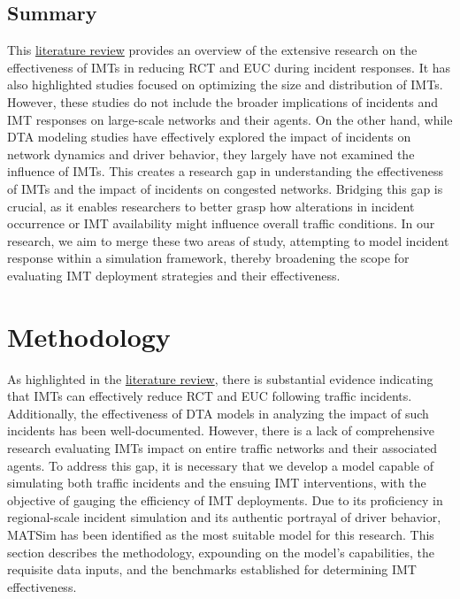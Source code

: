 \documentclass[fancy, oneside, mastersfancy, ms]{byuthesis}
\begin{document}
\hypertarget{sec-lit_summary}{%
\section{Summary}\label{sec-lit_summary}}

This \protect\hyperlink{sec-literature}{literature review} provides an
overview of the extensive research on the effectiveness of IMTs in
reducing RCT and EUC during incident responses. It has also highlighted
studies focused on optimizing the size and distribution of IMTs.
However, these studies do not include the broader implications of
incidents and IMT responses on large-scale networks and their agents. On
the other hand, while DTA modeling studies have effectively explored the
impact of incidents on network dynamics and driver behavior, they
largely have not examined the influence of IMTs. This creates a research
gap in understanding the effectiveness of IMTs and the impact of
incidents on congested networks. Bridging this gap is crucial, as it
enables researchers to better grasp how alterations in incident
occurrence or IMT availability might influence overall traffic
conditions. In our research, we aim to merge these two areas of study,
attempting to model incident response within a simulation framework,
thereby broadening the scope for evaluating IMT deployment strategies
and their effectiveness.


\hypertarget{sec-methods}{%
\chapter{Methodology}\label{sec-methods}}

As highlighted in the \protect\hyperlink{sec-literature}{literature
review}, there is substantial evidence indicating that IMTs can
effectively reduce RCT and EUC following traffic incidents.
Additionally, the effectiveness of DTA models in analyzing the impact of
such incidents has been well-documented. However, there is a lack of
comprehensive research evaluating IMTs impact on entire traffic networks
and their associated agents. To address this gap, it is necessary that
we develop a model capable of simulating both traffic incidents and the
ensuing IMT interventions, with the objective of gauging the efficiency
of IMT deployments. Due to its proficiency in regional-scale incident
simulation and its authentic portrayal of driver behavior, MATSim has
been identified as the most suitable model for this research. This
section describes the methodology, expounding on the model's
capabilities, the requisite data inputs, and the benchmarks established
for determining IMT effectiveness.
\end{document}
